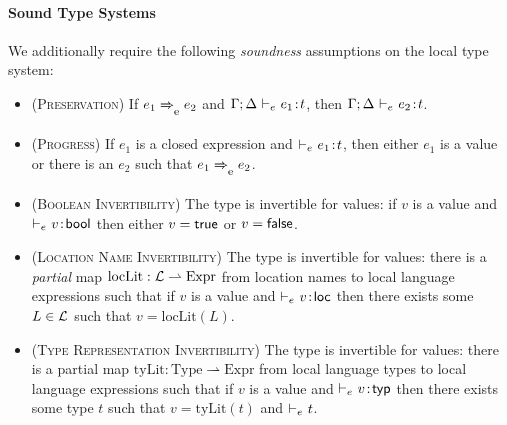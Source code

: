 \paragraph{Sound Type Systems}
\label{sec:sound-type-systems}
We additionally require the following \emph{soundness} assumptions on the local type system:
\begin{itemize}
	\item (\textsc{Preservation}) If $e_1 \localstep{} e_2$ and $\Gamma;\Delta ~{\vdash}_{\footnotesize{e}}~ e_1 \mkern2mu{:}\mkern2mu t$, then $\Gamma;\Delta ~{\vdash}_{\footnotesize{e}}~ e_2 \mkern2mu{:}\mkern2mu t$.

	\item (\textsc{Progress}) If $e_1$ is a closed expression and ${\vdash}_{\footnotesize{e}}~ e_1 \mkern2mu{:}\mkern2mu t$, then either $e_1$ is a value or there is an $e_2$ such that $e_1 \localstep{} e_2$.

	\item (\textsc{Boolean Invertibility}) The type \Bool is invertible for values: if $v$ is a value and ${\vdash}_{\footnotesize{e}}~ v \mkern2mu{:}\mkern2mu \mathsf{bool}$ then either $v = \mathsf{true}$ or $v = \mathsf{false}$.

	\item (\textsc{Location Name Invertibility}) The type \Loc is invertible for values: there is a \emph{partial} map $\text{locLit} : \mathcal{L} \rightharpoonup \text{Expr}$ from location names to local language expressions such that if $v$ is a value and ${\vdash}_{\footnotesize{e}}~ v \mkern2mu{:}\mkern2mu \mathsf{loc}$ then there exists some $L \in \mathcal{L}$ such that $v = \text{locLit}(L)$.

	\item (\textsc{Type Representation Invertibility}) The type \Typ is invertible for values: there is a partial map $\text{tyLit} : \text{Type} \rightharpoonup \text{Expr}$ from local language types to local language expressions such that if $v$ is a value and ${\vdash}_{\footnotesize{e}}~ v \mkern2mu{:}\mkern2mu \mathsf{typ}$ then there exists some type $t$ such that $v = \text{tyLit}(t)$ and ${\vdash}_{\footnotesize{e}}~ t$.
\end{itemize}

